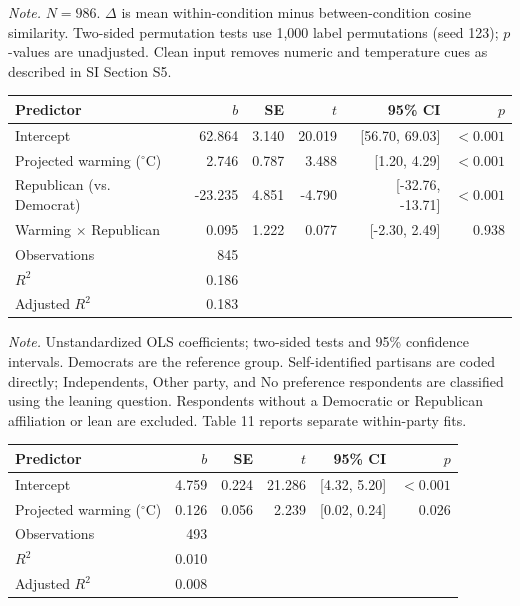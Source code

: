 \documentclass[11pt,a4paper]{article}
\begin{document}
\par\smallskip
{\footnotesize\textit{Note.} $N=986$. $\Delta$ is mean within-condition minus between-condition cosine similarity. Two-sided permutation tests use 1,000 label permutations (seed 123); $p$-values are unadjusted. Clean input removes numeric and temperature cues as described in SI Section S5.\par}
\endgroup\bigskip
\clearpage
{}\label{tab:5}
\begingroup\small
\begin{tabularx}{\textwidth}{@{}Xrrrrr@{}}
\toprule
Predictor & $b$ & SE & $t$ & 95\% CI & $p$ \\
\midrule
Intercept & 62.864 & 3.140 & 20.019 & [56.70, 69.03] & $<0.001$ \\
Projected warming ($^\circ$C) & 2.746 & 0.787 & 3.488 & [1.20, 4.29] & $<0.001$ \\
Republican (vs. Democrat) & -23.235 & 4.851 & -4.790 & [-32.76, -13.71] & $<0.001$ \\
Warming $\times$ Republican & 0.095 & 1.222 & 0.077 & [-2.30, 2.49] & 0.938 \\
Observations & 845 &  &  &  &  \\
$R^2$ & 0.186 &  &  &  &  \\
Adjusted $R^2$ & 0.183 &  &  &  &  \\
\bottomrule\end{tabularx}
\par\smallskip
{\footnotesize\textit{Note.} Unstandardized OLS coefficients; two-sided tests and 95\% confidence intervals. Democrats are the reference group. Self-identified partisans are coded directly; Independents, Other party, and No preference respondents are classified using the leaning question. Respondents without a Democratic or Republican affiliation or lean are excluded. Table 11 reports separate within-party fits.\par}
\endgroup\bigskip
\clearpage
{}\label{tab:6}
\begingroup\small
\begin{tabularx}{\textwidth}{@{}Xrrrrr@{}}
\toprule
Predictor & $b$ & SE & $t$ & 95\% CI & $p$ \\
\midrule
Intercept & 4.759 & 0.224 & 21.286 & [4.32, 5.20] & $<0.001$ \\
Projected warming ($^\circ$C) & 0.126 & 0.056 & 2.239 & [0.02, 0.24] & 0.026 \\
Observations & 493 &  &  &  &  \\
$R^2$ & 0.010 &  &  &  &  \\
Adjusted $R^2$ & 0.008 &  &  &  &  \\
\bottomrule\end{tabularx}
\end{document}
